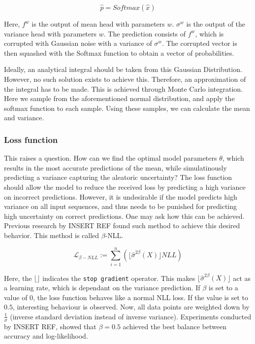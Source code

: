 \begin{equation}
    \hat{p} = Softmax(\hat{x})
\end{equation}

Here, $f^w$ is the output of mean head with parameters $w$. $\sigma^w$ is the output of the variance head with parameters $w$. The prediction consists of $f^w$, which is corrupted with Gaussian noise with a variance of $\sigma^w$. The corrupted vector is then squashed with the Softmax function to obtain a vector of probabilities.

Ideally, an analytical integral should be taken from this Gaussian Distribution. However, no such solution exists to achieve this. Therefore, an approximation of the integral has to be made. This is achieved through Monte Carlo integration. Here we sample from the aforementioned normal distribution, and apply the softmax function to each sample. Using these samples, we can calculate the mean and variance.


\subsubsection{Loss function}

This raises a question. How can we find the optimal model parameters $\theta$, which results in the most accurate predictions of the mean, while simulatinously predicting a variance capturing the aleatoric uncertainty? The loss function should allow the model to reduce the received loss by predicting a high variance on incorrect predictions. However, it is undesirable if the model predicts high variance on all input sequences, and thus needs to be punished for predicting high uncertainty on correct predictions. One may ask how this can be achieved. Previous research by {INSERT REF} found such method to achieve this desired behavior. This method is called $\beta$-NLL.

\begin{equation}
    \mathcal{L}_{\beta-NLL} := \sum_{i = 1}^{n} \left( \lfloor \hat{\sigma}^{2\beta}(X) \rfloor NLL \right)
\end{equation}

Here, the $\lfloor \rfloor$ indicates the \verb|stop gradient| operator. This makes $\lfloor \hat{\sigma}^{2\beta}(X) \rfloor$ act as a learning rate, which is dependant on the variance prediction. If $\beta$ is set to a value of 0, the loss function behaves like a normal NLL loss. If the value is set to $0.5$, interesting behaviour is observed. Now, all data points are weighted down by $\frac{1}{\sigma}$ (inverse standard deviation instead of inverse variance). Experiments conducted by {INSERT REF}, showed that $\beta = 0.5$ achieved the best balance between accuracy and log-likelihood.

